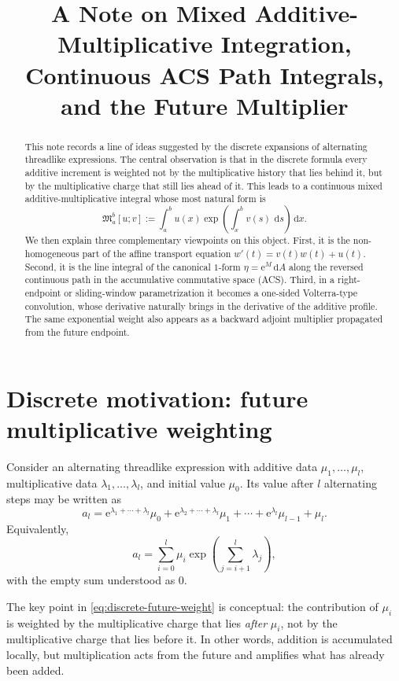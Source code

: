 \documentclass[11pt]{article}
\title{A Note on Mixed Additive-Multiplicative Integration,\\ Continuous ACS Path Integrals, and the Future Multiplier}
\author{}
\date{}
\newcommand{\maint}[2]{\mathfrak{M}_{#1}^{#2}}
\newcommand{\dd}{\,\mathrm{d}}
\newcommand{\ee}{\mathrm{e}}
\begin{document}
\maketitle

\begin{abstract}
This note records a line of ideas suggested by the discrete expansions of alternating threadlike expressions. The central observation is that in the discrete formula every additive increment is weighted not by the multiplicative history that lies behind it, but by the multiplicative charge that still lies ahead of it. This leads to a continuous mixed additive-multiplicative integral whose most natural form is
\[
\maint{a}{b}[u;v]
:=
\int_a^b u(x)\exp\!\left(\int_x^b v(s)\,\dd s\right)\dd x.
\]
We then explain three complementary viewpoints on this object. First, it is the non-homogeneous part of the affine transport equation $w'(t)=v(t)w(t)+u(t)$. Second, it is the line integral of the canonical $1$-form $\eta=\ee^M\dd A$ along the reversed continuous path in the accumulative commutative space (ACS). Third, in a right-endpoint or sliding-window parametrization it becomes a one-sided Volterra-type convolution, whose derivative naturally brings in the derivative of the additive profile. The same exponential weight also appears as a backward adjoint multiplier propagated from the future endpoint.
\end{abstract}

\section{Discrete motivation: future multiplicative weighting}

Consider an alternating threadlike expression with additive data $\mu_1,\dots,\mu_l$, multiplicative data $\lambda_1,\dots,\lambda_l$, and initial value $\mu_0$. Its value after $l$ alternating steps may be written as
\[
a_l
=
\ee^{\lambda_1+\cdots+\lambda_l}\mu_0
+
\ee^{\lambda_2+\cdots+\lambda_l}\mu_1
+
\cdots
+
\ee^{\lambda_l}\mu_{l-1}
+
\mu_l.
\]
Equivalently,
\begin{equation}
\label{eq:discrete-future-weight}
a_l
=
\sum_{i=0}^l \mu_i
\exp\!\left(\sum_{j=i+1}^l \lambda_j\right),
\end{equation}
with the empty sum understood as $0$.

The key point in \eqref{eq:discrete-future-weight} is conceptual: the contribution of $\mu_i$ is weighted by the multiplicative charge that lies \emph{after} $\mu_i$, not by the multiplicative charge that lies before it. In other words, addition is accumulated locally, but multiplication acts from the future and amplifies what has already been added.
\end{document}
